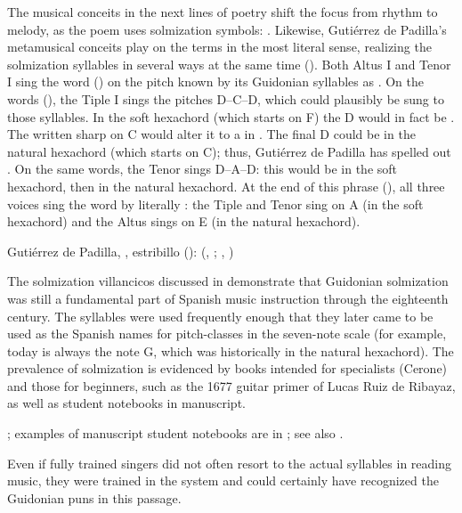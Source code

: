 
The musical conceits in the next lines of poetry shift the focus from rhythm to
melody, as the poem uses solmization symbols: .
Likewise, Gutiérrez de Padilla's metamusical conceits play on the terms in the
most literal sense, realizing the solmization syllables in several ways at the
same time ().
Both Altus I and Tenor I sing the word  () on the pitch
known by its Guidonian syllables as .
On the words  (), the Tiple I sings the
pitches D--C\sh{}--D, which could plausibly be sung to those syllables.
In the soft hexachord (which starts on F) the D would in fact be .
The written sharp on C would alter it to a  in . 
The final D could be  in the natural hexachord (which starts on C);
thus, Gutiérrez de Padilla has spelled out .
On the same words, the Tenor sings D--A--D: this would be  in the
soft hexachord, then  in the natural hexachord.
At the end of this phrase (), all three voices sing the word
 by literally : the Tiple and
Tenor sing  on A (in the soft hexachord) and the Altus sings 
on E (in the natural hexachord).


{Gutiérrez de Padilla, , estribillo
():  (,
; , )}

The solmization villancicos discussed in  demonstrate that
Guidonian solmization was still a fundamental part of Spanish music instruction
through the eighteenth century. 
The syllables were used frequently enough that they later came to be used as
the Spanish names for pitch-classes in the seven-note scale (for example,
 today is always the note G, which was historically  in the
natural hexachord).
The prevalence of solmization is evidenced by books intended for specialists
(Cerone) and those for beginners, such as the 1677 guitar primer of
Lucas Ruiz de Ribayaz, as well as student notebooks in manuscript.%
\begin{Footnote}
    \Autocite{Ruiz:Luz}; examples of manuscript student notebooks are in
    ; see also \autocite{Cohen:NotesMiddleAges}.
\end{Footnote}
Even if fully trained singers did not often resort to the actual syllables in
reading music, they were trained in the system and could certainly have
recognized the Guidonian puns in this passage.

